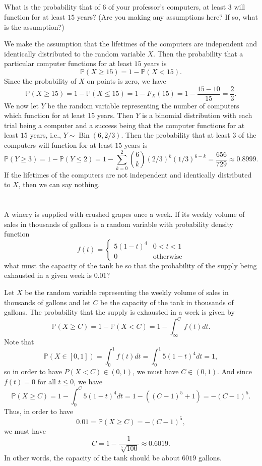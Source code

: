 \documentclass[12pt]{article}
\newenvironment{problem}
    {\begin{lrbox}{\mybox}\begin{minipage}{0.98\textwidth}}
    {\end{minipage}\end{lrbox}\framebox[\textwidth]{\usebox{\mybox}}}
\renewcommand{\P}{\mathbb{P}}
\newcommand{\Bin}{\operatorname{Bin}}
\begin{document}
\newpage
\subsection{}
\begin{problem}
    What is the probability that of $6$ of your professor’s computers, at least $3$ will function for at least $15$ years? (Are you making any assumptions here? If so, what is the assumption?)
\end{problem}
\medskip

We make the assumption that the lifetimes of the computers are independent and identically distributed to the random variable $X$. Then the probability that a particular computer functions for at least $15$ years is
\[
    \P(X \geq 15) = 1 - \P(X < 15).
\]
Since the probability of $X$ on points is zero, we have
\[
    \P(X \geq 15) = 1 - \P(X \leq 15) = 1 - F_X(15) = 1 - \frac{15 - 10}{15} = \frac23.
\]
We now let $Y$ be the random variable representing the number of computers which function for at least 15 years. Then $Y$ is a binomial distribution with each trial being a computer and a success being that the computer functions for at least $15$ years, i.e., $Y \sim \Bin(6, 2/3)$. Then the probability that at least $3$ of the computers will function for at least $15$ years is
\[
    \P(Y \geq 3) = 1 - \P(Y \leq 2) = 1 - \sum_{k=0}^2 \binom{6}{k} (2/3)^k (1/3)^{6 - k} = \frac{656}{729} \approx 0.8999.
\]
If the lifetimes of the computers are not independent and identically distributed to $X$, then we can say nothing.

\newpage
\section{}
\begin{problem}
    A winery is supplied with crushed grapes once a week. If its weekly volume of sales in thousands of gallons is a random variable with probability density function
    \[
        f(t) = \begin{cases}
            5(1 - t)^4 & 0 < t < 1 \\
            0 & \text{otherwise}
        \end{cases}
    \]
    what must the capacity of the tank be so that the probability of the supply being exhausted in a given week is $0.01$?
\end{problem}
\medskip

Let $X$ be the random variable representing the weekly volume of sales in thousands of gallons and let $C$ be the capacity of the tank in thousands of gallons. The probability that the supply is exhausted in a week is given by
\[
    \P(X \geq C) = 1 - \P(X < C) = 1 - \int_{\infty}^C f(t) dt.
\]
Note that
\[
    \P(X \in [0, 1]) = \int_0^1 f(t) dt = \int_0^1 5(1 - t)^4 dt = 1,
\]
so in order to have $P(X < C) \in (0, 1)$, we must have $C \in (0, 1)$. And since $f(t) = 0$ for all $t \leq 0$, we have
\[
    \P(X \geq C) = 1 - \int_0^C 5(1 - t)^4 dt = 1 - ((C - 1)^5 + 1) = -(C - 1)^5.
\]
Thus, in order to have
\[
    0.01 = \P(X \geq C) = -(C - 1)^5,
\]
we must have 
\[
    C = 1 - \frac{1}{\sqrt[5]{100}} \approx 0.6019.
\]
In other words, the capacity of the tank should be about $6019$ gallons.
\end{document}
